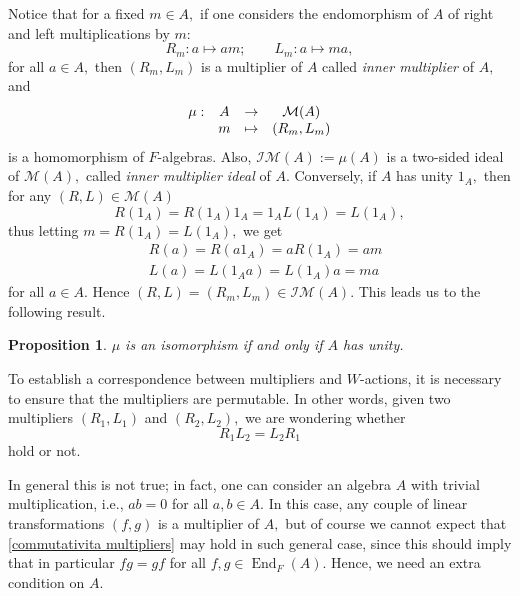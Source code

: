 \documentclass[reqno]{amsart}
\newtheorem{proposition}[theorem]{Proposition}
\theoremstyle{definition}
\numberwithin{equation}{section}
\numberwithin{theorem}{section}
\DeclareMathOperator{\End}{End}
\newcommand{\M}{\mathcal{M}}
\newcommand{\IM}{\mathcal{I}\mathcal{M}}
\begin{document}
Notice that for a fixed $m\in A,$ if one considers the endomorphism of $A$ of right and left multiplications by $m$:
\begin{equation*}\label{eq: L_m and R_m}
     R_m:a\mapsto am; \quad \quad L_m:a\mapsto ma,
\end{equation*}
for all $a\in A,$ then $(R_m,L_m)$ is a multiplier of $A$ called \emph{inner multiplier} of $A,$  and 
\begin{equation}\label{eq: omomorfismo A e M(A)}
    \begin{matrix}
    \mu: & A & \rightarrow & \M(A) \\
    \null & m & \mapsto & (R_m,L_m)
\end{matrix}
\end{equation}
is a homomorphism of $F$-algebras. Also, $\IM(A):=\mu(A)$ is a two-sided ideal of $\M(A),$ called \emph{inner multiplier ideal} of $A.$
Conversely, if $A$ has unity $1_A,$ then for any $(R,L)\in\M(A)$
$$
R(1_A)= R(1_A)1_A=1_AL(1_A)=L(1_A),
$$
thus letting $m=R(1_A)=L(1_A),$ we get
\begin{equation*}
    \begin{split}
        &R(a) = R(a1_A) = aR(1_A) = am\\
         &L(a) = L(1_A a)=L(1_A) a = ma
    \end{split}
\end{equation*}
for all $a\in A.$ Hence $(R,L)=(R_m,L_m)\in \IM(A).$  
This leads us to the following result.

\begin{proposition}\label{isomorfismo con algebra di mult}
$\mu$ is an isomorphism
    if and only if $A$ has unity.
\end{proposition}


To establish a correspondence between multipliers and $W$-actions,  it is necessary to ensure that the multipliers are permutable.
In other words, given two multipliers $(R_1,L_1)$ and $(R_2,L_2),$ we are wondering whether 
\begin{equation}\label{commutativita multipliers}
    R_{1}L_{2} = L_{2}R_{1} %
\end{equation}
hold or not.

In general this is not true; in fact, one can consider an algebra $A$ with trivial multiplication, i.e., $ab=0$ for all $a,b\in A.$ In this case, any couple of linear transformations $(f,g)$ is a multiplier of $A,$ but of course we cannot expect that \eqref{commutativita multipliers} may hold in such general case, since this should imply that in particular $fg=gf$ for all $f,g\in\End_F(A).$
Hence, we need an extra condition on $A.$
\end{document}
